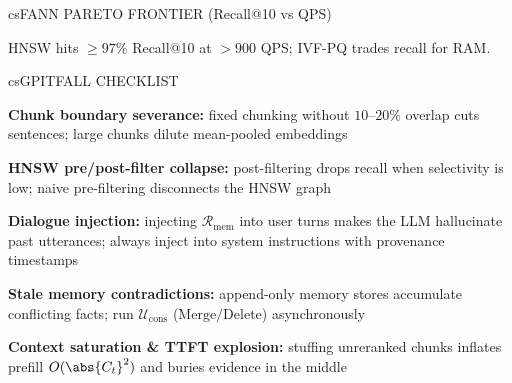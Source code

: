 \documentclass[../../../../master.tex]{subfiles}
\begin{document}
\begin{cscolumns}
\begin{cscard}{csF}{ANN PARETO FRONTIER (Recall@10 vs QPS)}
  \centering
  \par
  {\scriptsize HNSW hits $\ge 97\%$ Recall@10 at $>900$ QPS; IVF-PQ trades recall for RAM.}
\end{cscard}
\columnbreak

\begin{cscard}{csG}{PITFALL CHECKLIST}
  \begin{csbul}
    \item \textbf{Chunk boundary severance:} fixed chunking without $10\text{--}20\%$ overlap cuts sentences; large chunks dilute mean-pooled embeddings
    \item \textbf{HNSW pre/post-filter collapse:} post-filtering drops recall when selectivity is low; naive pre-filtering disconnects the HNSW graph
    \item \textbf{Dialogue injection:} injecting $\mathcal{R}_{\mathrm{mem}}$ into user turns makes the LLM hallucinate past utterances; always inject into system instructions with provenance timestamps
    \item \textbf{Stale memory contradictions:} append-only memory stores accumulate conflicting facts; run $\mathcal{U}_{\mathrm{cons}}$ ($\mathrm{Merge}/\mathrm{Delete}$) asynchronously
    \item \textbf{Context saturation \& TTFT explosion:} stuffing unreranked chunks inflates prefill $O(\abs{C_t}^2)$ and buries evidence in the middle
  \end{csbul}
\end{cscard}


\end{cscolumns}
\end{document}
